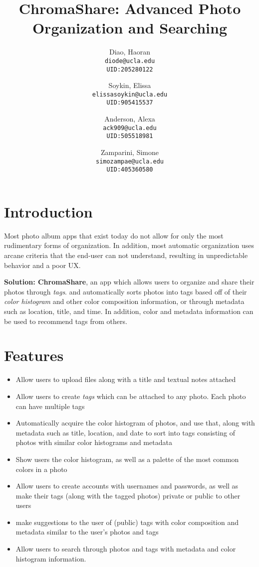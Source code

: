 \documentclass{article}
\title{ChromaShare: Advanced Photo Organization and Searching}
\author {
	Diao, Haoran\\ \texttt{diode@ucla.edu}\\ \texttt{UID:205280122}
	\and
	Soykin, Elissa\\ \texttt{elissasoykin@ucla.edu}\\ \texttt{UID:905415537}
	\and
	Anderson, Alexa\\ \texttt{ack909@ucla.edu}\\ \texttt{UID:505518981}
	\and
	Zamparini, Simone\\ \texttt{simozampae@ucla.edu}\\ \texttt{UID:405360580}
}
\begin{document}
\maketitle
\section{Introduction}
	Most photo album apps that exist today do not allow for only the most
	rudimentary forms of organization. In addition, most automatic
	organization uses arcane criteria that the end-user can not understand,
	resulting in unpredictable behavior and a poor UX.

	\textbf{Solution: ChromaShare}, an app which allows users to organize
	and share their photos through \textit{tags}. and automatically sorts
	photos into tags based off of their \textit{color histogram} and other color
	composition information, or through metadata such as location, title,
	and time. In addition, color and metadata information can be used to
	recommend tags from others.
\section{Features}

	\begin{itemize}
		\item Allow users to upload files along with a title and textual
		notes attached
		\item Allow users to create \textit{tags} which can be attached
		to any photo. Each photo can have multiple tags
		\item Automatically acquire the color histogram of photos, and
		use that, along with metadata such as title, location, and date
		to sort into tags consisting of photos with similar color
		histograms and metadata
		\item Show users the color histogram, as well as a palette of
		the most common colors in a photo
		\item Allow users to create accounts with usernames and
		passwords, as well as make their tags (along with the tagged
		photos) private or public to other users
		\item make suggestions to the user of (public) tags with color
		composition and metadata similar to the user's photos and tags
		\item Allow users to search through photos and tags with
		metadata and color histogram information.
	\end{itemize}
\end{document}
